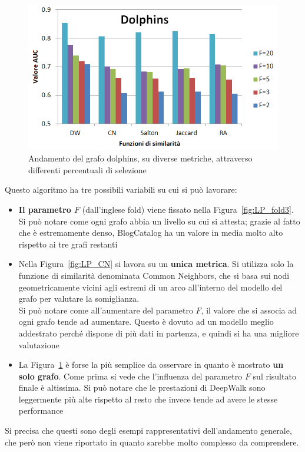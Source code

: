 \begin{figure}[htp]
	\centering
	\includegraphics[width=\linewidth]{immagini/LP_Dolphins}
	\caption{Andamento del grafo dolphins, su diverse metriche, attraverso differenti percentuali di selezione}
	\label{fig:LP_Dolphins}
\end{figure}
%
Questo algoritmo ha tre possibili variabili su cui si può lavorare:
\begin{itemize}
	\item \textbf{Il parametro $F$} (dall'inglese fold) viene fissato nella Figura~\ref{fig:LP_fold3}. Si può notare come ogni grafo abbia un livello su cui si attesta; grazie al fatto che è estremamente denso, BlogCatalog ha un valore in media molto alto rispetto ai tre grafi restanti
	\item Nella Figura~\ref{fig:LP_CN} si lavora su un \textbf{unica metrica}. Si utilizza solo la funzione di similarità denominata Common Neighbors, che si basa sui nodi geometricamente vicini agli estremi di un arco all'interno del modello del grafo per valutare la somiglianza.\\
	Si può notare come all'aumentare del parametro $F$, il valore che si associa ad ogni grafo tende ad aumentare. Questo è dovuto ad un modello meglio addestrato perché dispone di più dati in partenza, e quindi si ha una migliore valutazione
	\item La Figura~\ref{fig:LP_Dolphins} è forse la più semplice da osservare in quanto è mostrato \textbf{un solo grafo}. Come prima si vede che l'influenza del parametro $F$ sul risultato finale è altissima. Si può notare che le prestazioni di DeepWalk sono leggermente più alte rispetto al resto che invece tende ad avere le stesse performance 
\end{itemize}
Si precisa che questi sono degli esempi rappresentativi dell'andamento generale, che però non viene riportato in quanto sarebbe molto complesso da comprendere.
%
